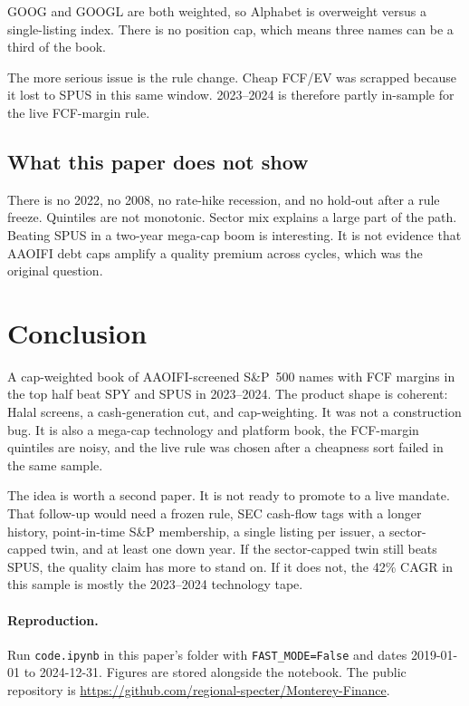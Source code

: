 \documentclass[11pt,letterpaper]{article}
\begin{document}
GOOG and GOOGL are both weighted, so Alphabet is overweight versus a single-listing index. There is no position cap, which means three names can be a third of the book.

The more serious issue is the rule change. Cheap FCF/EV was scrapped because it lost to SPUS in this same window. 2023--2024 is therefore partly in-sample for the live FCF-margin rule.

\subsection{What this paper does not show}

There is no 2022, no 2008, no rate-hike recession, and no hold-out after a rule freeze. Quintiles are not monotonic. Sector mix explains a large part of the path. Beating SPUS in a two-year mega-cap boom is interesting. It is not evidence that AAOIFI debt caps amplify a quality premium across cycles, which was the original question.

\section{Conclusion}
\label{sec:conc}

A cap-weighted book of AAOIFI-screened S\&P~500 names with FCF margins in the top half beat SPY and SPUS in 2023--2024. The product shape is coherent: Halal screens, a cash-generation cut, and cap-weighting. It was not a construction bug. It is also a mega-cap technology and platform book, the FCF-margin quintiles are noisy, and the live rule was chosen after a cheapness sort failed in the same sample.

The idea is worth a second paper. It is not ready to promote to a live mandate. That follow-up would need a frozen rule, SEC cash-flow tags with a longer history, point-in-time S\&P membership, a single listing per issuer, a sector-capped twin, and at least one down year. If the sector-capped twin still beats SPUS, the quality claim has more to stand on. If it does not, the 42\% CAGR in this sample is mostly the 2023--2024 technology tape.

\paragraph{Reproduction.}
Run \texttt{code.ipynb} in this paper's folder with \texttt{FAST\_MODE=False} and dates 2019-01-01 to 2024-12-31. Figures are stored alongside the notebook. The public repository is \url{https://github.com/regional-specter/Monterey-Finance}.
\end{document}
